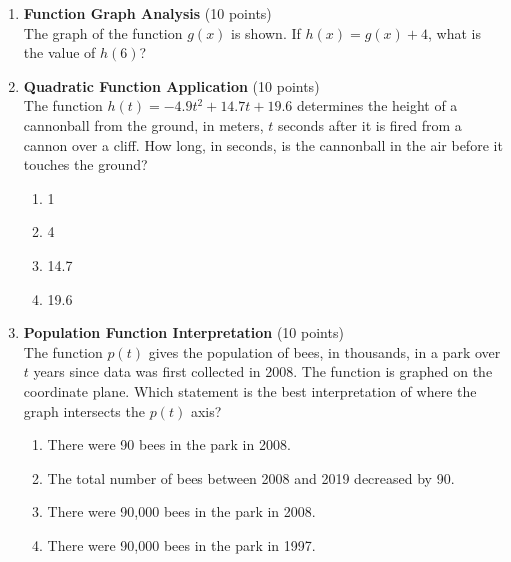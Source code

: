 \begin{enumerate}
  \newpage

  \item \textbf{Function Graph Analysis} (10 points)\\
  The graph of the function $g(x)$ is shown. If $h(x)=g(x)+4$, what is the value of $h(6)$?
  \begin{subanswer}
  \end{subanswer}



  \item \textbf{Quadratic Function Application} (10 points)\\
  The function $h(t)=-4.9 t^2+14.7 t+19.6$ determines the height of a cannonball from the ground, in meters, $t$ seconds after it is fired from a cannon over a cliff. How long, in seconds, is the cannonball in the air before it touches the ground?
  \begin{enumerate}[label=(\Alph*)]
    \item 1
    \item 4
    \item 14.7
    \item 19.6
  \end{enumerate}
  \begin{subanswer}
  \end{subanswer}


  \newpage

  \item \textbf{Population Function Interpretation} (10 points)\\
  The function $p(t)$ gives the population of bees, in thousands, in a park over $t$ years since data was first collected in 2008. The function is graphed on the coordinate plane. Which statement is the best interpretation of where the graph intersects the $p(t)$ axis?
  \begin{enumerate}[label=(\Alph*)]
    \item There were 90 bees in the park in 2008.
    \item The total number of bees between 2008 and 2019 decreased by 90.
    \item There were 90,000 bees in the park in 2008.
    \item There were 90,000 bees in the park in 1997.
  \end{enumerate}
  \begin{subanswer}
  \end{subanswer}


\end{enumerate}
